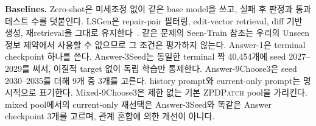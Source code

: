 \documentclass[10pt,conference]{IEEEtran}
\begin{document}
\noindent\textbf{Baselines.} Zero-shot은 미세조정 없이 같은 base model을 쓰고, 실패 후 판정과 통과 테스트 수를 덧붙인다. LSGen은 repair-pair 필터링, edit-vector retrieval, diff 기반 생성, 재retrieval을 그대로 유지한다~\cite{dai2026learner}. 같은 문제의 Seen-Train 참조는 우리의 Unseen 정보 제약에서 사용할 수 없으므로 그 조건은 평가하지 않는다. Answer-1은 terminal checkpoint 하나를 쓴다. Answer-3Seed는 동일한 terminal 짝 40,454개에 seed 2027--2029를 써서, 이질적 target 없이 독립 학습만 통제한다. Answer-9Choose3은 seed 2030--2035를 더해 9개 중 3개를 고른다. history prompt와 current-only prompt는 명시적으로 표기한다. Mixed-9Choose3은 제한 없는 기본 \textsc{ZPDPatch} pool을 가리킨다. mixed pool에서의 current-only 재선택은 Answer-3Seed와 똑같은 Answer checkpoint 3개를 고르며, 관계 혼합에 의한 개선이 아니다.
\end{document}
